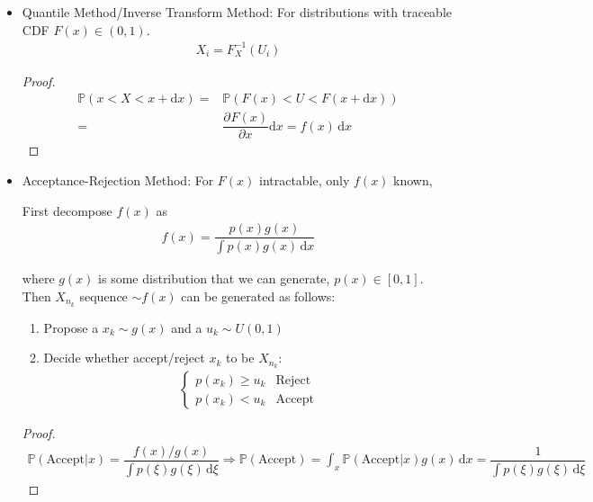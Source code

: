 \begin{itemize}[topsep=2pt,itemsep=0pt]
    \item Quantile Method/Inverse Transform Method: For distributions with traceable CDF $ F(x) \in (0,1)$.\hypertarget{StatisticalSimulationInverseTrans}{}
    \begin{align}
         X_i=F^{-1}_X(U_i)
    \end{align}

    \begin{proof}
    \begin{align}
        \mathbb{P}\left(x<X<x+\mathrm{d}x \right)=&\mathbb{P}\left(F(x)<U<F(x+\mathrm{d} x)\right)\\
        =&\dfrac{\partial^{} F(x)}{\partial x^{}}\mathrm{d}x =f(x)\,\mathrm{d}x
    \end{align} 
    \end{proof}
    \item Acceptance-Rejection Method: For $ F(x) $ intractable, only $ f(x) $ known, %
    
    First decompose $ f(x) $ as 
    \begin{align}
        f(x)=\dfrac{p(x)g(x)}{\int p(x)g(x) \,\mathrm{d}x} 
    \end{align}
    
    where $ g(x) $ is some distribution that we can generate, $ p(x)\in [0,1] $. Then $ X_{n_k} $ sequence $ \sim f(x) $ can be generated as follows:
\begin{enumerate}[topsep=2pt,itemsep=2pt]
    \item Propose a $ x_k \sim g(x)$ and a $ u_k\sim U(0,1) $\hypertarget{StatisticalSimulationARS}{}
    \item Decide whether accept/reject $ x_k $ to be $ X_{n_k} $:
    \begin{align}
        \begin{cases}
            p(x_k)\geq u_k&\text{Reject}\\
            p(x_k)<u_k&\text{Accept}
        \end{cases} 
    \end{align}
\end{enumerate}
    \begin{proof}
    \begin{align}
        \mathbb{P}(\mathrm{Accept}|x )=\dfrac{f(x)\big/ g(x)}{\int p(\xi )g(\xi ) \,\mathrm{d}\xi }\Rightarrow \mathbb{P}(\mathrm{Accept} )=\int _x \mathbb{P}(\mathrm{Accept}|x )g(x)\,\mathrm{d}x=\dfrac{1}{\int p(\xi )g(\xi ) \,\mathrm{d}\xi}
    \end{align}


\end{proof}
\end{itemize}

